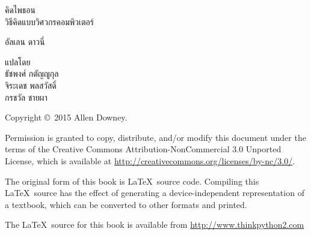 \begin{latexonly}
\begin{flushright}
\begin{spacing}{3}
{\huge คิดไพธอน}\\
{\Large วิธีคิดแบบวิศวกรคอมพิวเตอร์}
\end{spacing}

\vspace{0.25in}



\thedate

\vspace{1in}


{\Large
อัลเลน ดาวนี่
}

{\large
แปลโดย
\\
ธัชพงศ์ กตัญญูกุล
\\
จิระเดช พลสวัสดิ์
\\
กรชวัล ชายผา
\\
}

\vspace{0.5in}



\vfill

\end{flushright}


\pagebreak
\thispagestyle{empty}

{\small
Copyright \copyright ~2015 Allen Downey.


\vspace{0.2in}


Permission is granted to copy, distribute, and/or modify this document
under the terms of the Creative Commons Attribution-NonCommercial 3.0 Unported
License, which is available at \url{http://creativecommons.org/licenses/by-nc/3.0/}.

The original form of this book is \LaTeX\ source code.  Compiling this
\LaTeX\ source has the effect of generating a device-independent
representation of a textbook, which can be converted to other formats
and printed.

The \LaTeX\ source for this book is available from
\url{http://www.thinkpython2.com}

\vspace{0.2in}

} %

\end{latexonly}


